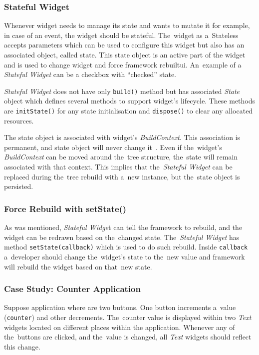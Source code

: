 \subsubsection{Stateful Widget}
Whenever widget needs to manage its state and wants to mutate it for example, in case of an event, the widget should be stateful. The~widget as a~Stateless accepts parameters which can be used to configure this widget but also has an associated object, called state. This state object is an active part of the widget and is used to change widget and force framework rebuilt\gls{ui}. An~example of a \textit{Stateful Widget} can be a checkbox with ``checked'' state. 

\textit{Stateful Widget} does not have only \verb|build()| method but has associated \textit{State} object which defines several methods to support widget's lifecycle. These methods are \verb|initState()| for any state initialisation and \verb|dispose()| to clear any allocated resources. 

The state object is associated with widget's \textit{BuildContext}. This association is permanent, and state object will never change it~\cite{notion-widget-didier}. Even if the~widget's \textit{BuildContext} can be moved around the~tree structure, the~state will remain associated with that context. This implies that the~\textit{Stateful Widget} can be replaced during the~tree rebuild with a~new instance, but the~state object is persisted. 
\subsubsection{Force Rebuild with setState()}
As was mentioned, \textit{Stateful Widge}t can tell the framework to rebuild, and the widget can be redrawn based on the~changed state. The~\textit{Stateful Widget} has method \verb|setState(callback)| which is used to do such rebuild. Inside \verb|callback| a~developer should change the~widget's state to the~new value and framework will rebuild the widget based on that~new state. 
\subsubsection{Case Study: Counter Application}
Suppose application where are two buttons. One button increments a~value (\verb|counter|) and other decrements. The~counter value is displayed within two \textit{Text} widgets located on different places within the application. Whenever any of the~buttons are clicked, and the~value is changed, all \textit{Text} widgets should reflect this change.

